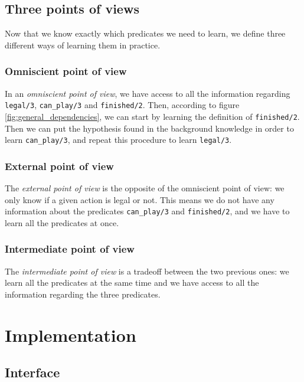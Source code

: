 \subsection{Three points of views}

Now that we know exactly which predicates we need to learn, we define three different ways of learning them in practice.

\subsubsection{Omniscient point of view}

In an \textit{omniscient point of view}, we have access to all the information regarding \texttt{legal/3}, \texttt{can\_play/3} and \texttt{finished/2}. Then, according to figure \ref{fig:general_dependencies}, we can start by learning the definition of \texttt{finished/2}. Then we can put the hypothesis found in the background knowledge in order to learn \texttt{can\_play/3}, and repeat this procedure to learn \texttt{legal/3}. 

\subsubsection{External point of view}

The \textit{external point of view} is the opposite of the omniscient point of view: we only know if a given action is legal or not. This means we do not have any information about the predicates \texttt{can\_play/3} and \texttt{finished/2}, and we have to learn all the predicates at once.

\subsubsection{Intermediate point of view}

The \textit{intermediate point of view} is a tradeoff between the two previous ones: we learn all the predicates at the same time and we have access to all the information regarding the three predicates.

\section{Implementation}

\subsection{Interface}

